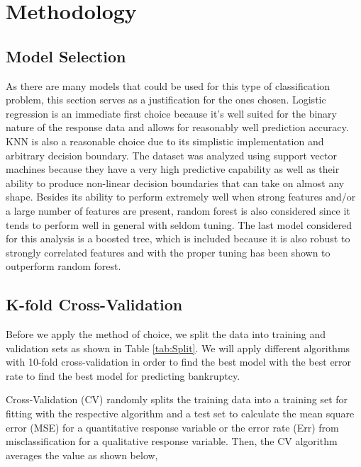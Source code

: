 \documentclass[12pt]{report}
\begin{document}
\begingroup
\renewcommand{\cleardoublepage}{}
\renewcommand{\clearpage}{}

\chapter{Methodology} %
\endgroup

\section{Model Selection}

As there are many models that could be used for this type of classification problem, this section serves as a justification for the ones chosen. Logistic regression is an immediate first choice because it's well suited for the binary nature of the response data and allows for reasonably well prediction accuracy. KNN is also a reasonable choice due to its simplistic implementation and arbitrary decision boundary. The dataset was analyzed using support vector machines because they have a very high predictive capability as well as their ability to produce non-linear decision boundaries that can take on almost any shape. Besides its ability to perform extremely well when strong features and/or a large number of features are present, random forest is also considered since it tends to perform well in general with seldom tuning. The last model considered for this analysis is a boosted tree, which is included because it is also robust to strongly correlated features and with the proper tuning has been shown to outperform random forest. 


\section{K-fold Cross-Validation}
Before we apply the method of choice, we split the data into training and validation sets as shown in Table \ref{tab:Split}. We will apply different algorithms with 10-fold cross-validation in order to find the best model with the best error rate to find the best model for predicting bankruptcy.

Cross-Validation (CV) randomly splits the training data into a training set for fitting with the respective algorithm and a test set to calculate the mean square error (MSE) for a quantitative response variable or the error rate (Err) from misclassification for a qualitative response variable. Then, the CV algorithm averages the value as shown below,
\end{document}

